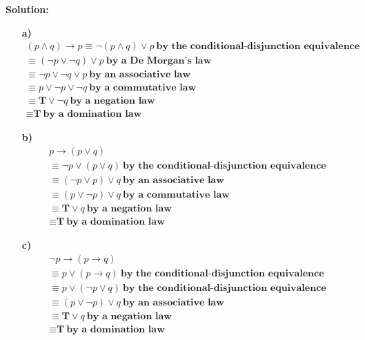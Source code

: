 \documentclass{Axon}
\begin{document}
\noindent
\textbf{Solution:}
\begin{enumerate}
    \item[\textbf{a)}] 
    \begin{gather*}
        (p \land q) \to p \equiv \lnot(p \land q) \lor p \ \textbf{by the conditional-disjunction equivalence} \\
        \equiv (\lnot p \lor \lnot q) \lor p \ \textbf{by a De Morgan's law} \\
        \equiv \lnot p \lor \lnot q \lor p \ \textbf{by an associative law} \\
        \equiv p \lor \lnot p \lor \lnot q \ \textbf{by a commutative law} \\
        \equiv \textbf{T} \lor \lnot q \ \textbf{by a negation law} \\
        \equiv \textbf{T} \ \textbf{by a domination law}
    \end{gather*}
    
    \item[\textbf{b)}]
    \begin{gather*}
        p \to (p \lor q) \\
        \equiv \lnot p \lor (p \lor q) \ \textbf{by the conditional-disjunction equivalence} \\
        \equiv (\lnot p \lor p) \lor q \ \textbf{by an associative law} \\
        \equiv (p \lor \lnot p) \lor q \ \textbf{by a commutative law} \\
        \equiv \textbf{T} \lor q \ \textbf{by a negation law} \\
        \equiv \textbf{T} \ \textbf{by a domination law}
    \end{gather*}
    
    \item[\textbf{c)}]
    \begin{gather*}
        \lnot p \to (p \to q) \\
        \equiv p \lor (p \to q) \ \textbf{by the conditional-disjunction equivalence} \\
        \equiv p \lor (\lnot p \lor q) \ \textbf{by the conditional-disjunction equivalence} \\
        \equiv (p \lor \lnot p) \lor q \ \textbf{by an associative law} \\
        \equiv \textbf{T} \lor q \ \textbf{by a negation law} \\
        \equiv \textbf{T} \ \textbf{by a domination law}
    \end{gather*}
    

\end{enumerate}
\end{document}
